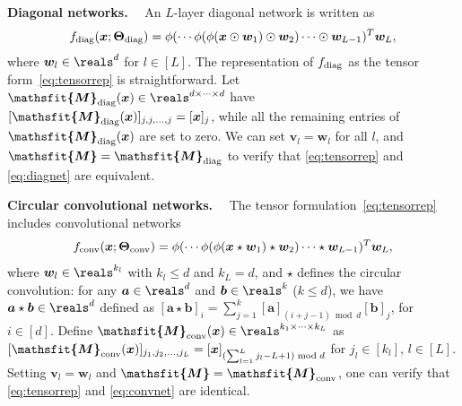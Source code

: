 \documentclass{article} %
\def\va{{\bm{a}}}
\def\vb{{\bm{b}}}
\def\vv{{\bm{v}}}
\def\vw{{\bm{w}}}
\def\vx{{\bm{x}}}
\newcommand{\tens}[1]{\bm{\mathsfit{#1}}}
\def\tM{{\tens{M}}}
\newcommand{\bTheta}{\bm{\Theta}}
\newcommand{\bThetadiag}{\bTheta_{\rm diag}}
\newcommand{\bThetaconv}{\bTheta_{\rm conv}}
\newcommand{\fdiag}{f_{\rm diag}}
\newcommand{\fconv}{f_{\rm conv}}
\newcommand{\tMdiag}{\tM_{\rm diag}}
\newcommand{\tMconv}{\tM_{\rm conv}}
\begin{document}
\textbf{Diagonal networks.}~~
An $L$-layer diagonal network is written as
\begin{align}
\label{eq:diagnet}
    \fdiag (\vx; \bThetadiag) = \phi(\cdots\phi (\phi(\vx \odot \vw_1) \odot \vw_2)\cdots \odot \vw_{L-1})^T \vw_L,
\end{align}
where $\vw_l \in \reals^d$ for $l \in [L]$. The representation of $\fdiag$ as the tensor form~\eqref{eq:tensorrep} is straightforward. Let $\tMdiag(\vx) \in \reals^{d \times \cdots \times d}$ have 
   $[\tMdiag(\vx)]_{j,j,\dots,j} = [\vx]_j$,
while all the remaining entries of $\tMdiag(\vx)$ are set to zero.
We can set $\vv_l = \vw_l$ for all $l$, and $\tM = \tMdiag$ to verify that \eqref{eq:tensorrep} and \eqref{eq:diagnet} are equivalent.



\textbf{Circular convolutional networks.}~~
The tensor formulation~\eqref{eq:tensorrep} includes convolutional networks
\begin{align}
\label{eq:convnet}
    \fconv(\vx; \bThetaconv) = \phi(\cdots\phi(\phi(\vx \star \vw_1) \star \vw_2 ) \cdots  \star \vw_{L-1})^T \vw_L,
\end{align}
where $\vw_l \in \reals^{k_l}$ with $k_l \leq d$ and $k_L = d$, and $\star$ defines the circular convolution: for any $\va \in \reals^d$ and $\vb \in \reals^k$ ($k \leq d$), we have $\va \star \vb \in \reals^d$ defined as
$[\va \star \vb]_i = \sum_{j=1}^k [\va]_{(i+j-1) \bmod d} [\vb]_j$, for $i \in [d]$.
Define $\tMconv(\vx) \in \reals^{k_1 \times \cdots \times k_L}$ as
$[\tMconv(\vx)]_{j_1,j_2,\dots,j_L} = 
[\vx]_{(\sum_{l=1}^L j_l-L+1) \bmod d}$
for $j_l \in [k_l]$, $l \in [L]$. 
Setting $\vv_l = \vw_l$ and $\tM = \tMconv$, one can verify that \eqref{eq:tensorrep} and \eqref{eq:convnet} are identical.
\end{document}
